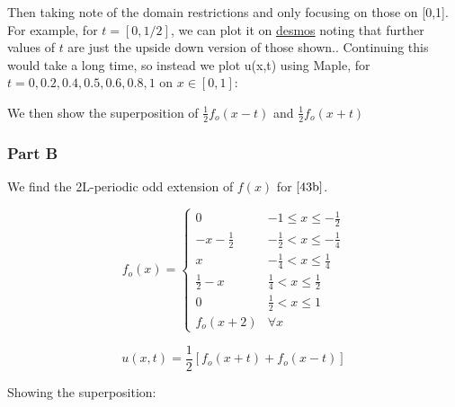 \documentclass{article}
\begin{document}
Then taking note of the domain restrictions and only focusing on those on [0,1]. For example, for $t = [0,1/2]$, we can plot it on \href{https://www.desmos.com/calculator/vyjpnm3bxv}{desmos} noting that further values of $t$ are just the upside down version of those shown.. Continuing this would take a long time, so instead we plot u(x,t) using Maple, for $t=0,0.2,0.4,0.5,0.6,0.8,1$ on $x \in [0,1]$:


We then show the superposition of $\frac{1}{2} f_o(x-t)$ and $\frac{1}{2} f_o(x+t)$



\subsubsection*{Part B}

We find the 2L-periodic odd extension of $f(x)$ for $\eqref{43b}$.

$$
f_o(x) = \begin{cases}
0 & -1 \leq x \leq -\frac{1}{2} \\
-x-\frac{1}{2} & -\frac{1}{2} < x \leq -\frac{1}{4}\\
x & -\frac{1}{4} < x \leq \frac{1}{4} \\
\frac{1}{2} -x & \frac{1}{4} < x \leq \frac{1}{2} \\
0 & \frac{1}{2} < x \leq 1 \\
f_o (x+2) & \forall x 
   \end{cases}
$$

$$u(x,t) = \frac{1}{2} \left[ f_o(x+t)+f_o(x-t)\right]$$




Showing the superposition:
\end{document}
